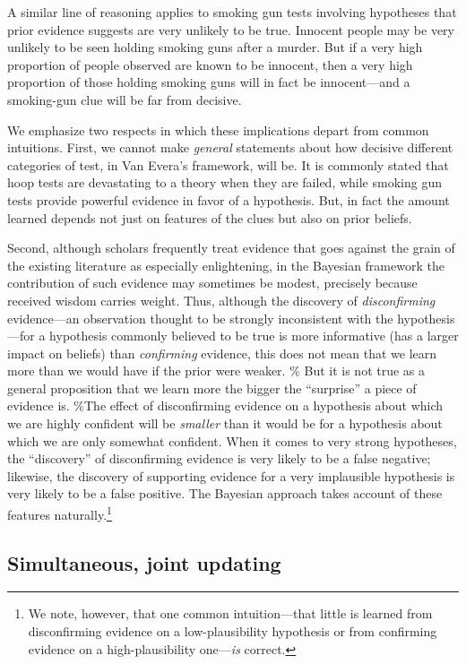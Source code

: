 \documentclass[12pt,]{book}
\let\rmarkdownfootnote\footnote%
\def\footnote{\protect\rmarkdownfootnote}
\begin{document}
A similar line of reasoning applies to smoking gun tests involving hypotheses that prior evidence suggests are very unlikely to be true. Innocent people may be very unlikely to be seen holding smoking guns after a murder. But if a very high proportion of people observed are known to be innocent, then a very high proportion of those holding smoking guns will in fact be innocent---and a smoking-gun clue will be far from decisive.

We emphasize two respects in which these implications depart from common intuitions. First, we cannot make \emph{general} statements about how decisive different categories of test, in Van Evera's framework, will be. It is commonly stated that hoop tests are devastating to a theory when they are failed, while smoking gun tests provide powerful evidence in favor of a hypothesis. But, in fact the amount learned depends not just on features of the clues but also on prior beliefs.

Second, although scholars frequently treat evidence that goes against the grain of the existing literature as especially enlightening, in the Bayesian framework the contribution of such evidence may sometimes be modest, precisely because received wisdom carries weight. Thus, although the discovery of \emph{disconfirming} evidence---an observation thought to be strongly inconsistent with the hypothesis---for a hypothesis commonly believed to be true is more informative (has a larger impact on beliefs) than \emph{confirming} evidence, this does not mean that we learn more than we would have if the prior were weaker. \% But it is not true as a general proposition that we learn more the bigger the ``surprise'' a piece of evidence is.
\%The effect of disconfirming evidence on a hypothesis about which we are highly confident will be \emph{smaller} than it would be for a hypothesis about which we are only somewhat confident.
When it comes to very strong hypotheses, the ``discovery'' of disconfirming evidence is very likely to be a false negative; likewise, the discovery of supporting evidence for a very implausible hypothesis is very likely to be a false positive. The Bayesian approach takes account of these features naturally.\footnote{We note, however, that one common intuition---that little is learned from disconfirming evidence on a low-plausibility hypothesis or from confirming evidence on a high-plausibility one---\emph{is} correct.}

\hypertarget{simultaneous-joint-updating}{%
\subsection{Simultaneous, joint updating}\label{simultaneous-joint-updating}}
\end{document}
